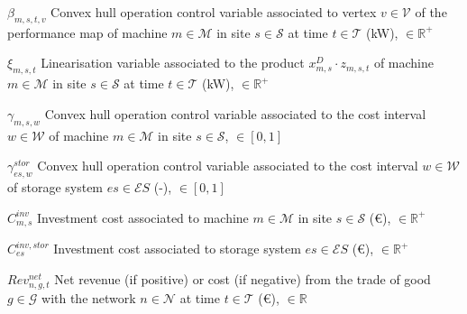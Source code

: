\documentclass{article}
\newcommand{\cT}{{\mathcal T}}
\newcommand{\cM}{{\mathcal M}}
\newcommand{\cS}{{\mathcal S}}
\newcommand{\cES}{{\mathcal ES}}
\newcommand{\cN}{{\mathcal N}}
\newcommand{\cV}{{\mathcal V}}
\newcommand{\cG}{{\mathcal G}}
\newcommand{\cW}{{\mathcal W}}
\newcommand{\bbR}{{\mathbb R}}
\newcommand\mydescriptionopt{
	\IEEEsetlabelwidth{$g \in \cG_{\textit{off}}^0$]}
	\IEEEusemathlabelsep
}
\begin{document}
\begin{IEEEdescription}[\mydescriptionopt]
	\item[$\beta_{m, s, t, v}$] Convex hull operation control variable associated to vertex $v \in \cV$ of the performance map of machine $m \in \cM$ in site $s \in \cS$ at time $t \in \cT$ (kW), $\in \bbR^+$
	\item[$\xi_{m, s, t}$] Linearisation variable associated to the product $x_{m,s}^D \cdot z_{m,s,t}$ of machine $m \in \cM$ in site $s \in \cS$ at time $t \in \cT$ (kW), $\in \bbR^+$
	
	\item[$\gamma_{m, s, w}$] Convex hull operation control variable associated to the cost interval $w \in \cW$ of machine $m \in \cM$ in site $s \in \cS$, $\in [0,1]$
	\item[$\gamma_{es, w}^{stor}$] Convex hull operation control variable associated to the cost interval $w \in \cW$ of storage system $es \in \cES$ (-), $\in [0,1]$
	
	\item[$C_{m, s}^{inv}$] Investment cost associated to machine $m \in \cM$ in site $s \in \cS$ (\euro), $\in \bbR^+$
	\item[$C_{es}^{inv, stor}$] Investment cost associated to storage system $es \in \cES$ (\euro), $\in \bbR^+$
		
	\item[$Rev_{n, g, t}^{net}$] Net revenue (if positive) or cost (if negative) from the trade of good $g \in \cG$ with the network $n \in \cN$ at time $t \in \cT$ (\euro), $\in \bbR$

\end{IEEEdescription}
\end{document}
